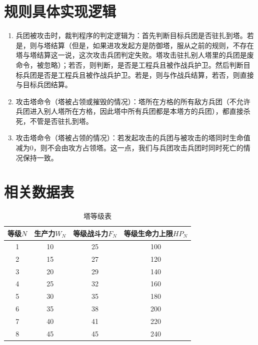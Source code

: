 \documentclass[a4paper,4pt]{article}
\begin{document}
\section{规则具体实现逻辑}\label{细则}
\begin{enumerate}[fullwidth, itemindent=2em, label=(\arabic*)]
  \item 兵团被攻击时，裁判程序的判定逻辑为：首先判断目标兵团是否驻扎到塔。若是，则与塔结算（但是，如果进攻发起方是防御塔，服从之前的规则，不存在塔与塔结算这一说，这次攻击兵团判定失败。塔攻击驻扎别人塔里的兵团是废命令，被忽略）；若否，则判断，是否是工程兵且被作战兵护卫。然后判断目标兵团是否是工程兵且被作战兵护卫。若是，则与作战兵结算，若否，则直接与目标兵团结算。
  \item 攻击塔命令（塔被占领或摧毁的情况）：塔所在方格的所有敌方兵团（不允许兵团进入别人塔所在方格，因此塔中所有兵团都是本塔方的兵团），都直接杀死，不管是否驻扎到塔。
  \item 攻击塔命令（塔被占领的情况）：若发起攻击的兵团与被攻击的塔同时生命值减为0，则不会由攻方占领塔。这一点，我们与兵团攻击兵团时同时死亡的情况保持一致。

\end{enumerate}


\section{相关数据表}
\begin{table}[htbp]
  \centering
  \caption{塔等级表}
  \label{塔等级表}%
  \begin{tabular}{c|c|c|c}
    \hline
    等级$N$ & 生产力$W_N$ & 等级战斗力$F_N$ & 等级生命力上限$HP_N$ \bigstrut \\
    \hline
    1       & 10          & 25              & 100 \bigstrut                  \\
    \hline
    2       & 15          & 27              & 120 \bigstrut                  \\
    \hline
    3       & 20          & 29              & 140 \bigstrut                  \\
    \hline
    4       & 25          & 32              & 160 \bigstrut                  \\
    \hline
    5       & 30          & 35              & 180 \bigstrut                  \\
    \hline
    6       & 35          & 38              & 200 \bigstrut                  \\
    \hline
    7       & 40          & 41              & 220 \bigstrut                  \\
    \hline
    8       & 45          & 45              & 240 \bigstrut                  \\
    \hline
  \end{tabular}%

\end{table}%
\end{document}
